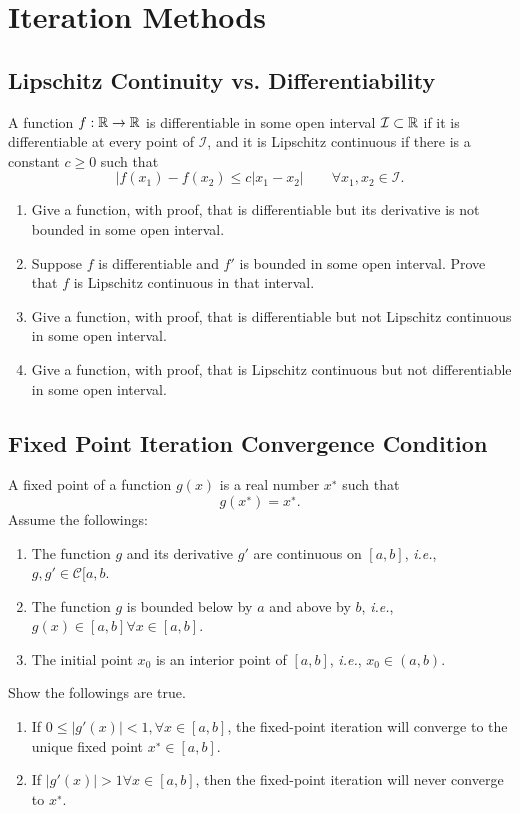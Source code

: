 \renewcommand{\chaptername}{Assignment}
\chapter{Iteration Methods}


\section{Lipschitz Continuity vs. Differentiability}
A function \(f:\mathbb{R}\to\mathbb{R}\) is differentiable in some open interval \(\mathcal{I}\subset\mathbb{R}\) if it is differentiable at every point of \(\mathcal{I}\), and it is Lipschitz continuous if there is a constant \(c\geq0\) such that
\[ |f(x_1)-f(x_2)\leq c|x_1-x_2| \qquad \forall x_1,x_2\in\mathcal{I}. \]
\begin{enumerate}
	\item Give a function, with proof, that is differentiable but its derivative is not bounded in some open interval.
	\item Suppose $f$ is differentiable and $f'$ is bounded in some open interval.
	Prove that $f$ is Lipschitz continuous in that interval.
	\item Give a function, with proof, that is differentiable but not Lipschitz continuous in some open interval.
	\item Give a function, with proof, that is Lipschitz continuous but not differentiable in some open interval.
\end{enumerate}



\section{Fixed Point Iteration Convergence Condition}
A fixed point of a function \(g(x)\) is a real number \(x^∗\) such that
\[ g(x^∗ )=x^∗. \]
Assume the followings:
\begin{enumerate}
	\item The function $g$ and its derivative $g'$ are continuous on \([a, b]\), \textit{i.e.}, \(g,g'\in\mathcal{C}[a,b\).
	\item The function $g$ is bounded below by $a$ and above by $b$, \textit{i.e.}, \(g(x)\in[a, b] \forall x\in[a,b]\).
	\item The initial point \(x_0\) is an interior point of \([a,b]\), \textit{i.e.}, \(x_0\in(a, b)\).
\end{enumerate}
Show the followings are true.
\begin{enumerate}
	\item If \(0\leq|g'(x)|<1, \forall x\in[a,b]\), the fixed-point iteration will converge to the unique fixed point \(x^∗\in[a,b]\).
	\item If \(|g'(x)|>1 \forall x\in[a,b]\), then the fixed-point iteration will never converge to \(x^∗\).
\end{enumerate}


